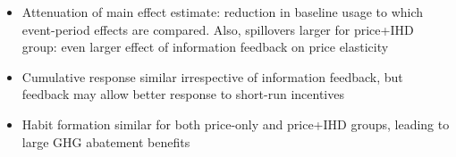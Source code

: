 \documentclass[12pt]{article}
\begin{document}
\begin{itemize}
        \begin{itemize}
            \item Attenuation of main effect estimate: reduction in baseline usage to which event-period effects are compared. Also, spillovers larger for price+IHD group: even larger effect of information feedback on price elasticity
            \item Cumulative response similar irrespective of information feedback, but feedback may allow better response to short-run incentives
            \item Habit formation similar for both price-only and price+IHD groups, leading to large GHG abatement benefits
        \end{itemize}
\end{itemize}
\end{document}
